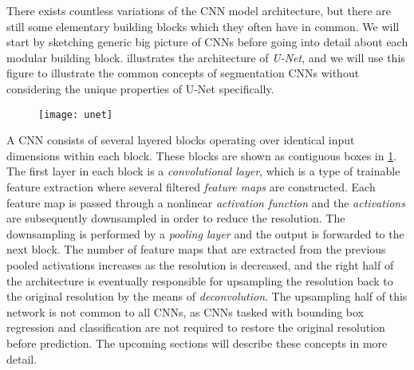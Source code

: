 There exists countless variations of the CNN model architecture, but there are still some elementary building blocks which they often have in common.
We will start by sketching generic big picture of CNNs before going into detail about each modular building block.
 illustrates the architecture of \textit{U-Net}, and we will use this figure to illustrate the common concepts of segmentation CNNs without considering the unique properties of U-Net specifically.

\begin{figure}[H]
  \texttt{[image: unet]}
  \label{fig:unet}
\end{figure}

A CNN consists of several layered blocks operating over identical input dimensions within each block.
These blocks are shown as contiguous boxes in \cref{fig:unet}.
The first layer in each block is a \textit{convolutional layer}, which is a type of trainable feature extraction where several filtered \textit{feature maps} are constructed.
Each feature map is passed through a nonlinear \textit{activation function} and the \textit{activations} are subsequently downsampled in order to reduce the resolution.
The downsampling is performed by a \textit{pooling layer} and the output is forwarded to the next block.
The number of feature maps that are extracted from the previous pooled activations increases as the resolution is decreased, and the right half of the architecture is eventually responsible for upsampling the resolution back to the original resolution by the means of \textit{deconvolution}.
The upsampling half of this network is not common to all CNNs, as CNNs tasked with bounding box regression and classification are not required to restore the original resolution before prediction.
The upcoming sections will describe these concepts in more detail.

